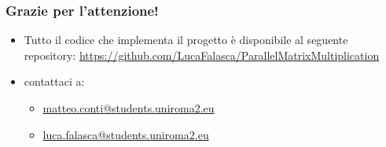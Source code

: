\documentclass[compress]{beamer}
\begin{document}
\begin{frame}
    \frametitle{Grazie per l'attenzione!}
    \begin{itemize}
        \item Tutto il codice che implementa il progetto è disponibile al
        seguente repository: \href{https://github.com/LucaFalasca/ParallelMatrixMultiplication}{https://github.com/LucaFalasca/ParallelMatrixMultiplication}
        \item contattaci a:
            \begin{itemize}
                \item \href{mailto:matteo.conti@students.uniroma2.eu}{matteo.conti@students.uniroma2.eu}
                \item \href{mailto:luca.falasca@students.uniroma2.eu}{luca.falasca@students.uniroma2.eu}
            \end{itemize}
       \end{itemize}
\end{frame}
\end{document}
